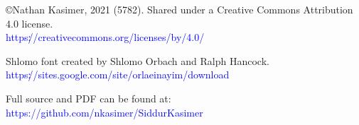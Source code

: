\author{מסודר ע״י
\\
\textbf{ﭏיעזר בן זאב וואלף קזימיר}}
\date{נוסח אשכנז}

\maketitle

\begin{minipage}{\textwidth}
\begin{english}
\raggedright
\vfill
©Nathan Kasimer, 2021 (5782). Shared under a Creative Commons Attribution 4.0 license.\\
\textcolor{blue}{https׃//creativecommons.org/licenses/by/4.0/}\\ \vspace{\baselineskip}


Shlomo font created by Shlomo Orbach and Ralph Hancock.\\ \textcolor{blue}{https׃//sites.google.com/site/orlaeinayim/download}\\ \vspace{\baselineskip}

Full \XeLaTeX \quad source and PDF can be found at:\\ \textcolor{blue}{https://github.com/nkasimer/Siddur\textunderscore Kasimer}\\ \vspace{\baselineskip}


\end{english}
\end{minipage}
\clearpage
